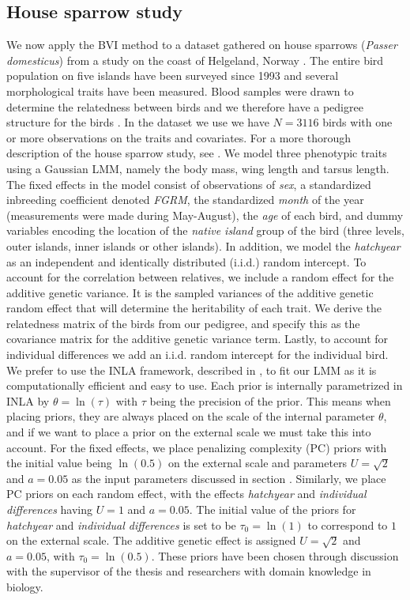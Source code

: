 \subsection{House sparrow study}
We now apply the BVI method to a dataset gathered on house sparrows (\textit{Passer domesticus}) from a study on the coast of Helgeland, Norway \citep{Stensland_GMRF_bayes_animal_model}. The entire bird population on five islands have been surveyed since 1993 and several morphological traits have been measured. Blood samples were drawn to determine the relatedness between birds and we therefore have a pedigree structure for the birds \citep[citing Jensen et al., 2003, 2004, 2008]{Stensland_GMRF_bayes_animal_model}. In the dataset we use we have $N=3116$ birds with one or more observations on the traits and covariates. For a more thorough description of the house sparrow study, see \citet[and references therein]{Stensland_GMRF_bayes_animal_model}. We model three phenotypic traits using a Gaussian LMM, namely the body mass, wing length and tarsus length. The fixed effects in the model consist of observations of \textit{sex}, a standardized inbreeding coefficient denoted \textit{FGRM}, the standardized \textit{month} of the year (measurements were made during May-August), the \textit{age} of each bird, and dummy variables encoding the location of the \textit{native island} group of the bird (three levels, outer islands, inner islands or other islands). In addition, we model the \textit{hatchyear}  as an independent and identically distributed (i.i.d.) random intercept. To account for the correlation between relatives, we include a random effect for the additive genetic variance. It is the sampled variances of the additive genetic random effect that will determine the heritability of each trait. We derive the relatedness matrix of the birds from our pedigree, and specify this as the covariance matrix for the additive genetic variance term. Lastly, to account for individual differences we add an i.i.d. random intercept for the individual bird. We prefer to use the INLA framework, described in , to fit our LMM as it is computationally efficient and easy to use. Each prior is internally parametrized in INLA by $\theta=\ln(\tau)$ with $\tau$ being the precision of the prior. This means when placing priors, they are always placed on the scale of the internal parameter $\theta$, and if we want to place a prior on the external scale we must take this into account. For the fixed effects, we place penalizing complexity (PC) priors with the initial value being $\ln(0.5)$ on the external scale and parameters $U=\sqrt{2}$ and $a=0.05$ as the input parameters discussed in section . Similarly, we place PC priors on each random effect, with the effects \textit{hatchyear} and \textit{individual differences} having $U=1$ and $a=0.05$. The initial value of the priors for \textit{hatchyear} and \textit{individual differences} is set to be $\tau_0=\ln(1)$ to correspond to $1$ on the external scale. The additive genetic effect is assigned $U=\sqrt{2}$ and $a=0.05$, with $\tau_0=\ln(0.5)$. These priors have been chosen through discussion with the supervisor of the thesis and researchers with domain knowledge in biology. 